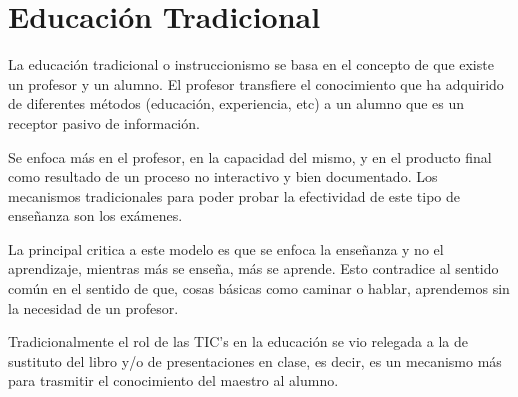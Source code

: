 \section{Educación Tradicional}

La educación tradicional o instruccionismo se basa en el concepto de que existe
un profesor y un alumno. El profesor transfiere el conocimiento que ha adquirido
de diferentes métodos (educación, experiencia, etc) a un alumno que es un
receptor pasivo de información\cite{johnson2005instructionism}.

Se enfoca más en el profesor, en la capacidad del mismo, y en el producto final
como resultado de un proceso no interactivo y bien
documentado\cite{igi:instructionism}. Los mecanismos tradicionales para poder
probar la efectividad de este tipo de enseñanza son los exámenes.

La principal critica a este modelo es que se enfoca la enseñanza y no el
aprendizaje, mientras más se enseña, más se aprende. Esto contradice al sentido
común en el sentido de que, cosas básicas como caminar o hablar, aprendemos sin
la necesidad de un
profesor\cite{ackoff:education}\cite{johnson2005instructionism}.

Tradicionalmente el rol de las TIC's en la educación se vio relegada a la de
sustituto del libro y/o de presentaciones en clase, es decir, es un mecanismo
más para trasmitir el conocimiento del maestro al alumno.


